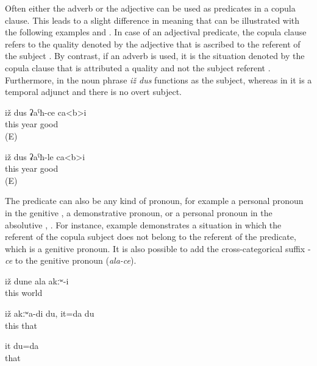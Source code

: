 Often either the adverb or the adjective can be used as predicates in a copula clause. This leads to a slight difference in meaning that can be illustrated with the following examples  and . In case of an adjectival predicate, the copula clause refers to the quality denoted by the adjective that is ascribed to the referent of the subject . By contrast, if an adverb is used, it is the situation denoted by the copula clause that is attributed a quality and not the subject referent . Furthermore, in  the noun phrase \textit{iž dus} functions as the subject, whereas in  it is a temporal adjunct and there is no overt subject.
%
\begin{exe}

	\ex	\label{ex:This year is good}
	\gll	iž	dus	ʡaˁħ-ce	ca<b>i\\
		this	year	good	\\
	\glt	{} (E)
	
	
	\ex	\label{ex:In / during this year it is good}
	\gll	iž	dus	ʡaˁħ-le	ca<b>i\\
		this	year	good	\\
	\glt	{} (E)

\end{exe}

The predicate can also be any kind of pronoun, for example a personal pronoun in the genitive , a demonstrative pronoun, or a personal pronoun in the absolutive , . For instance, example  demonstrates a situation in which the referent of the copula subject does not belong to the referent of the predicate, which is a genitive pronoun. It is also possible to add the cross-categorical suffix -\textit{ce} to the genitive pronoun (\textit{ala-ce}).
%
\begin{exe}
	\ex	\label{ex:‎‎This world was not yours}
	\gll	iž	dune	ala	akːʷ-i\\
		this	world		\\
	\glt	{}
	
	\ex	\label{ex:‎‎‎This is not me, that is me}
	\gll	iž	akːʷa-di	du,	it=da	du\\
		this			that	\\
	\glt	{}

	\ex	\label{ex:That is me}
	\gll	it	du=da\\
		that	\\
	\glt	{}
\end{exe}

